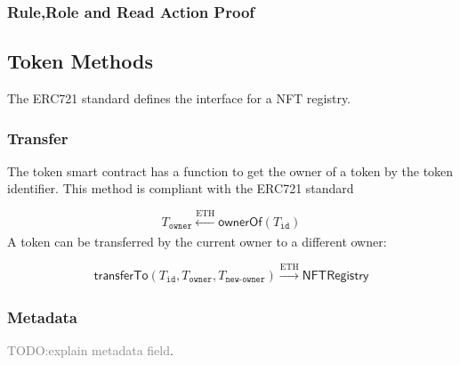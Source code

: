 \subsubsection{Rule,Role and Read Action Proof}

\subsection{Token Methods}
The ERC721 standard defines the interface for a NFT registry.
\subsubsection{Transfer}
The token smart contract has a function to get the owner of a token by the token identifier. This method is compliant with the ERC721 standard

\begin{equation}
 T_{\mathtt{owner}} \xleftarrow[]{\text{ETH}} \mathsf{ownerOf}(T_{\texttt{id}})
\end{equation}
A token can be transferred by the current owner to a different owner:

\begin{equation}
\mathsf{transferTo}(T_{\texttt{id}},T_{\texttt{owner}},T_{\texttt{new-owner}}) \xrightarrow[]{\text{ETH}}  \mathsf{NFTRegistry}
\end{equation}
\subsubsection{Metadata}
\textcolor{gray}{TODO:explain metadata field}.

